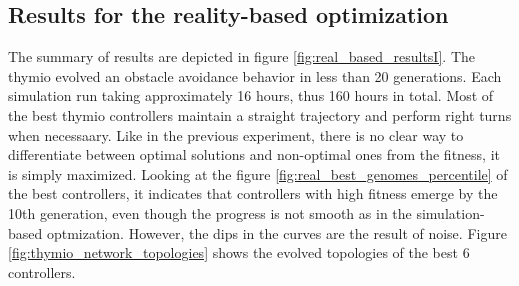 \subsection{Results for the reality-based optimization}

The summary of results are depicted in figure \ref{fig:real_based_resultsI}. The thymio evolved an obstacle avoidance behavior in less than 20 generations. Each simulation run taking  approximately 16 hours, thus 160 hours in total. Most of the best thymio controllers maintain a straight trajectory and perform right turns when necessaary. Like in the previous experiment, there is no clear way to differentiate between optimal solutions and non-optimal ones from the fitness, it is simply maximized. Looking at the figure \ref{fig:real_best_genomes_percentile} of the best controllers, it indicates that controllers with high fitness emerge by the 10th generation, even though the progress is not smooth as in the simulation-based optmization. However, the dips in the curves are the result of noise. Figure \ref{fig:thymio_network_topologies} shows the evolved topologies of the best 6 controllers.

